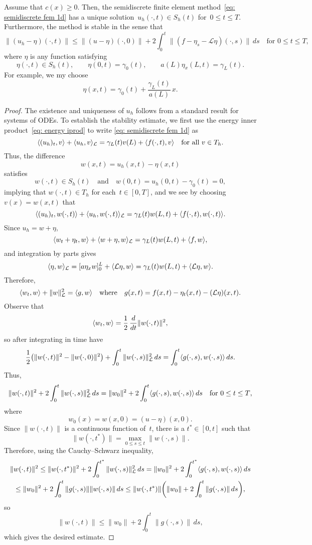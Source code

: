 \begin{theorem}
Assume that $c(x)\ge0$.  Then, the semidiscrete finite element 
method~\eqref{eq: semidiscrete fem 1d} has a unique 
solution~$u_h(\cdot,t)\in S_h(t)$ for~$0\le t\le T$.  Furthermore, the
method is stable in the sense that
\[
\|(u_h-\eta)(\cdot,t)\|\le\|(u-\eta)(\cdot,0)\|
	+2\int_0^t\|(f-\eta_s-\mathcal{L}\eta)(\cdot,s)\|\,ds
	\quad\text{for $0\le t\le T$,}
\]
where $\eta$ is any function satisfying
\[
\eta(\cdot,t)\in S_h(t),\qquad \eta(0,t)=\gamma_0(t),\qquad
	a(L)\eta_x(L,t)=\gamma_L(t).
\]  
For example, we my choose
\[
\eta(x,t)=\gamma_0(t)+\frac{\gamma_L(t)}{a(L)}\,x.
\]
\end{theorem}
\begin{proof}
The existence and uniqueness of $u_h$ follows from a standard result for
systems of ODEs.  To establish the stability estimate, we first
use the energy inner product~\eqref{eq: energy iprod} to write
\eqref{eq: semidiscrete fem 1d} as
\[
\langle(u_h)_t,v\rangle+\langle u_h,v\rangle_{\mathcal{L}}=\gamma_L(t)v(L)
	+\langle f(\cdot,t),v\rangle\quad\text{for all $v\in T_h$.}
\]
Thus, the difference 
\[
w(x,t)=u_h(x,t)-\eta(x,t)
\]
satisfies 
\[
w(\cdot,t)\in S_h(t)\quad\text{and}\quad
w(0,t)=u_h(0,t)-\gamma_0(t)=0,
\]
implying that $w(\cdot,t)\in T_h$ for each~$t\in[0,T]$, and we see by
choosing $v(x)=w(x,t)$ that
\[
\langle(u_h)_t,w(\cdot,t)\rangle+\langle u_h,w(\cdot,t)\rangle_{\mathcal{L}}
	=\gamma_L(t)w(L,t)+\langle f(\cdot,t),w(\cdot,t)\rangle.
\]
Since $u_h=w+\eta$,
\[
\langle w_t+\eta_t,w\rangle+\langle w+\eta,w\rangle_{\mathcal{L}}
	=\gamma_L(t)w(L,t)+\langle f,w\rangle,
\]
and integration by parts gives
\[
\langle\eta,w\rangle_{\mathcal{L}}=[a\eta_xw]_0^L+\langle\mathcal{L}\eta,w\rangle
	=\gamma_L(t)w(L,t)+\langle\mathcal{L}\eta,w\rangle.
\]
Therefore,
\[
\langle w_t,w\rangle+\|w\|_{\mathcal{L}}^2=\langle g,w\rangle
\quad\text{where}\quad g(x,t)=f(x,t)-\eta_t(x,t)-(\mathcal{L}\eta)(x,t).
\]
Observe that
\[
\langle w_t,w\rangle=\frac{1}{2}\,\frac{d}{dt}\|w(\cdot,t)\|^2,
\]
so after integrating in time have
\[
\frac{1}{2}\bigl(\|w(\cdot,t)\|^2-\|w(\cdot,0)\|^2\bigr)
    +\int_0^t\|w(\cdot,s)\|_{\mathcal{L}}^2\,ds
    =\int_0^t\langle g(\cdot,s),w(\cdot,s)\rangle\,ds.
\]
Thus,
\[
\|w(\cdot,t)\|^2+2\int_0^t\|w(\cdot,s)\|_{\mathcal{L}}^2\,ds
=\|w_0\|^2+2\int_0^t\langle g(\cdot,s),w(\cdot,s)\rangle\,ds
\quad\text{for $0\le t\le T$,}
\]
where 
\[
w_0(x)=w(x,0)=(u-\eta)(x,0).
\]
Since $\|w(\cdot,t)\|$ is a continuous function of~$t$, there is a 
$t^*\in[0,t]$ such that 
\[
\|w(\cdot,t^*)\|=\max_{0\le s\le t}\|w(\cdot,s)\|. 
\]
Therefore, using the Cauchy--Schwarz inequality,
\begin{multline*}
\|w(\cdot,t)\|^2\le\|w(\cdot,t^*)\|^2
    +2\int_0^{t^*}\|w(\cdot,s)\|_{\mathcal{L}}^2\,ds
=\|w_0\|^2+2\int_0^{t^*}\langle g(\cdot,s),w(\cdot,s)\rangle\,ds\\
\le\|w_0\|^2+2\int_0^t\|g(\cdot,s)\|\|w(\cdot,s)\|\,ds
\le\|w(\cdot,t^*)\|\biggl(\|w_0\|+2\int_0^t\|g(\cdot,s)\|\,ds\biggr),
\end{multline*}
so
\[
\|w(\cdot,t)\|\le\|w_0\|+2\int_0^t\|g(\cdot,s)\|\,ds,
\]
which gives the desired estimate.
\end{proof}
